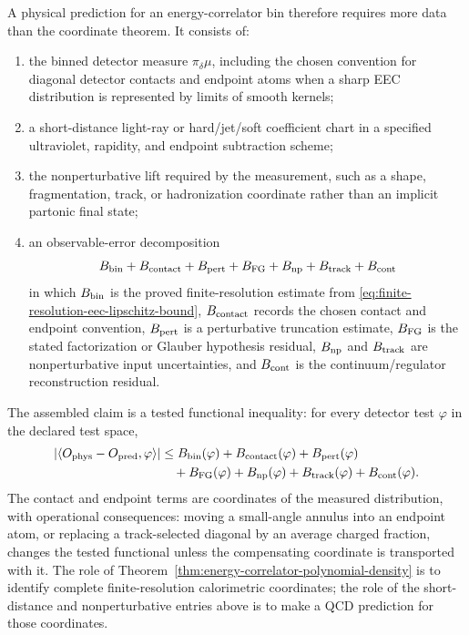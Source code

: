 \begin{controlledapproximation}
A physical prediction for an energy-correlator bin therefore requires more
data than the coordinate theorem.  It consists of:
\begin{enumerate}
  \item the binned detector measure \(\pi_\delta\mu\), including the chosen
  convention for diagonal detector contacts and endpoint atoms when a sharp
  EEC distribution is represented by limits of smooth kernels;
  \item a short-distance light-ray or hard/jet/soft coefficient chart in a
  specified ultraviolet, rapidity, and endpoint subtraction scheme;
  \item the nonperturbative lift required by the measurement, such as a shape,
  fragmentation, track, or hadronization coordinate rather than an implicit
  partonic final state;
  \item an observable-error decomposition
  \[
    B_{\rm bin}+B_{\rm contact}+B_{\rm pert}
    +B_{\rm FG}+B_{\rm np}+B_{\rm track}+B_{\rm cont}
  \]
  in which \(B_{\rm bin}\) is the proved finite-resolution estimate from
  \eqref{eq:finite-resolution-eec-lipschitz-bound}, \(B_{\rm contact}\)
  records the chosen contact and endpoint convention, \(B_{\rm pert}\) is a
  perturbative truncation estimate, \(B_{\rm FG}\) is the stated
  factorization or Glauber hypothesis residual, \(B_{\rm np}\) and
  \(B_{\rm track}\) are nonperturbative input uncertainties, and
  \(B_{\rm cont}\) is the continuum/regulator reconstruction residual.
\end{enumerate}
The assembled claim is a tested functional inequality: for every detector
test \(\varphi\) in the declared test space,
\begin{equation}
  \begin{aligned}
    \left|
    \left\langle O_{\rm phys}-O_{\rm pred},\varphi\right\rangle
    \right|
    &\leq
    B_{\rm bin}(\varphi)+B_{\rm contact}(\varphi)+B_{\rm pert}(\varphi)\\
    &\quad
    +B_{\rm FG}(\varphi)+B_{\rm np}(\varphi)
    +B_{\rm track}(\varphi)+B_{\rm cont}(\varphi).
  \end{aligned}
  \label{eq:finite-resolution-eec-observable-budget}
\end{equation}
The contact and endpoint terms are coordinates of the measured distribution,
with operational consequences: moving a small-angle annulus into an endpoint
atom, or replacing a track-selected diagonal by an average charged fraction,
changes the tested functional unless the compensating coordinate is
transported with it.  The role of
Theorem~\ref{thm:energy-correlator-polynomial-density} is to identify complete
finite-resolution calorimetric coordinates; the role of the short-distance and
nonperturbative entries above is to make a QCD prediction for those
coordinates.
\end{controlledapproximation}

